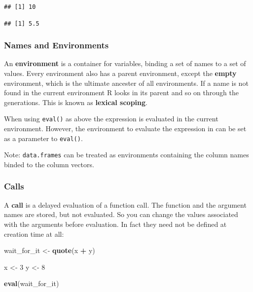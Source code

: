 \documentclass[]{book}
\newenvironment{Shaded}{\begin{snugshade}}{\end{snugshade}}
\newcommand{\DecValTok}[1]{\textcolor[rgb]{0.00,0.00,0.81}{#1}}
\newcommand{\KeywordTok}[1]{\textcolor[rgb]{0.13,0.29,0.53}{\textbf{#1}}}
\newcommand{\NormalTok}[1]{#1}
\newcommand{\OperatorTok}[1]{\textcolor[rgb]{0.81,0.36,0.00}{\textbf{#1}}}
\newcommand{\StringTok}[1]{\textcolor[rgb]{0.31,0.60,0.02}{#1}}
\begin{document}
\begin{verbatim}
## [1] 10
\end{verbatim}

\begin{Shaded}
\end{Shaded}

\begin{verbatim}
## [1] 5.5
\end{verbatim}

\hypertarget{names-and-environments}{%
\subsubsection{Names and Environments}\label{names-and-environments}}

An \textbf{environment} is a container for variables, binding a set of names to a set of values.
Every environment also has a parent environment, except the \textbf{empty} environment, which is
the ultimate ancester of all environments. If a name is not found in the current environment
R looks in its parent and so on through the generations. This is known as \textbf{lexical
scoping}.

When using \texttt{eval()} as above the expression is evaluated in the current environment.
However, the environment to evaluate the expression in can be set as a parameter to
\texttt{eval()}.

Note: \texttt{data.frames} can be treated as environments containing the column names binded to the
column vectors.

\hypertarget{calls}{%
\subsubsection{Calls}\label{calls}}

A \textbf{call} is a delayed evaluation of a function call. The function and the argument names
are stored, but not evaluated. So you can change the values associated with the arguments
before evaluation. In fact they need not be defined at creation time at all:

\begin{Shaded}
\begin{Highlighting}[]
\NormalTok{wait_for_it <-}\StringTok{ }\KeywordTok{quote}\NormalTok{(x }\OperatorTok{+}\StringTok{ }\NormalTok{y)}

\NormalTok{x <-}\StringTok{ }\DecValTok{3}
\NormalTok{y <-}\StringTok{ }\DecValTok{8}

\KeywordTok{eval}\NormalTok{(wait_for_it)}
\end{Highlighting}
\end{Shaded}
\end{document}
